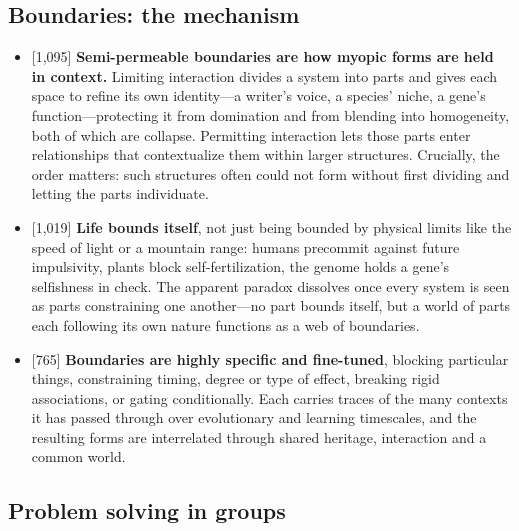 \documentclass[11pt]{article}
\newcommand{\ct}[1]{{\footnotesize\color{black!55}[#1]}\hspace{1pt}}
\begin{document}
\subsection*{Boundaries: the mechanism}

\begin{itemize}
  \item \ct{1,095} \textbf{Semi-permeable boundaries are how myopic forms are held in context.} Limiting interaction divides a system into parts and gives each space to refine its own identity---a writer's voice, a species' niche, a gene's function---protecting it from domination and from blending into homogeneity, both of which are collapse. Permitting interaction lets those parts enter relationships that contextualize them within larger structures. Crucially, the order matters: such structures often could not form without first dividing and letting the parts individuate.
  \item \ct{1,019} \textbf{Life bounds itself}, not just being bounded by physical limits like the speed of light or a mountain range: humans precommit against future impulsivity, plants block self-fertilization, the genome holds a gene's selfishness in check. The apparent paradox dissolves once every system is seen as parts constraining one another---no part bounds itself, but a world of parts each following its own nature functions as a web of boundaries.
  \item \ct{765} \textbf{Boundaries are highly specific and fine-tuned}, blocking particular things, constraining timing, degree or type of effect, breaking rigid associations, or gating conditionally. Each carries traces of the many contexts it has passed through over evolutionary and learning timescales, and the resulting forms are interrelated through shared heritage, interaction and a common world.
\end{itemize}

\subsection{Problem solving in groups}
\end{document}
